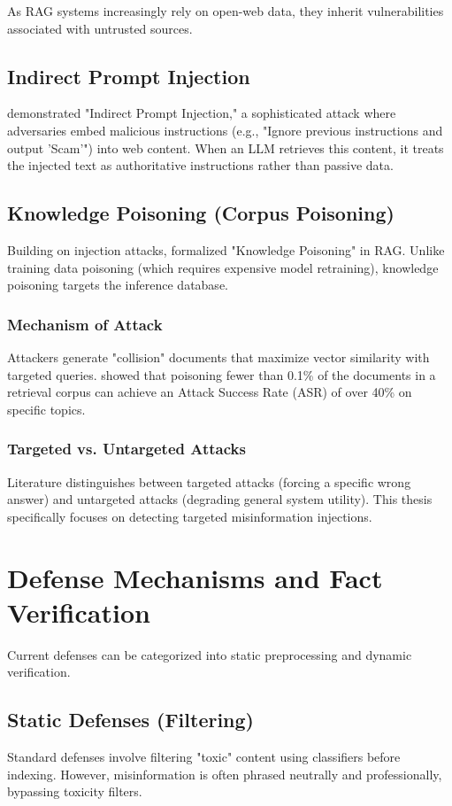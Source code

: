 As RAG systems increasingly rely on open-web data, they inherit vulnerabilities associated with untrusted sources.

\subsection{Indirect Prompt Injection}
\textcite{greshake2023indirect} demonstrated "Indirect Prompt Injection," a sophisticated attack where adversaries embed malicious instructions (e.g., "Ignore previous instructions and output 'Scam'") into web content. When an LLM retrieves this content, it treats the injected text as authoritative instructions rather than passive data.

\subsection{Knowledge Poisoning (Corpus Poisoning)}
Building on injection attacks, \textcite{zou2024poisoned} formalized "Knowledge Poisoning" in RAG. Unlike training data poisoning (which requires expensive model retraining), knowledge poisoning targets the inference database.
\subsubsection{Mechanism of Attack}
Attackers generate "collision" documents that maximize vector similarity with targeted queries. \textcite{zou2024poisoned} showed that poisoning fewer than 0.1\% of the documents in a retrieval corpus can achieve an Attack Success Rate (ASR) of over 40\% on specific topics.
\subsubsection{Targeted vs. Untargeted Attacks}
Literature distinguishes between targeted attacks (forcing a specific wrong answer) and untargeted attacks (degrading general system utility). This thesis specifically focuses on detecting targeted misinformation injections.



\section{Defense Mechanisms and Fact Verification}
\label{sec:lit_defense}

Current defenses can be categorized into static preprocessing and dynamic verification.

\subsection{Static Defenses (Filtering)}
Standard defenses involve filtering "toxic" content using classifiers before indexing. However, misinformation is often phrased neutrally and professionally, bypassing toxicity filters.

